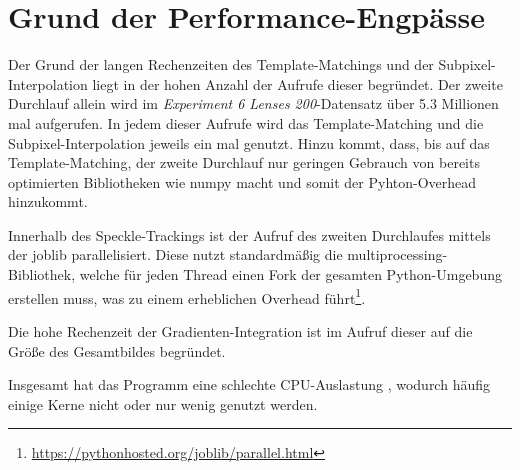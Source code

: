\section{Grund der Performance-Engpässe}

Der Grund der langen Rechenzeiten des Template-Matchings und der Subpixel-Interpolation liegt in der hohen Anzahl der Aufrufe dieser begründet. Der zweite Durchlauf allein wird im \textit{Experiment 6 Lenses 200}-Datensatz über 5.3 Millionen mal aufgerufen. In jedem dieser Aufrufe wird das Template-Matching und die Subpixel-Interpolation jeweils ein mal genutzt. Hinzu kommt, dass, bis auf das Template-Matching, der zweite Durchlauf nur geringen Gebrauch von bereits optimierten Bibliotheken wie numpy macht und somit der Pyhton-Overhead hinzukommt. 

Innerhalb des Speckle-Trackings ist der Aufruf des zweiten Durchlaufes mittels der joblib parallelisiert. Diese nutzt standardmäßig die multiprocessing-Bibliothek, welche für jeden Thread einen Fork der gesamten Python-Umgebung erstellen muss, was zu einem erheblichen Overhead führt\footnote{\url{https://pythonhosted.org/joblib/parallel.html}}.

Die hohe Rechenzeit der Gradienten-Integration ist im Aufruf dieser auf die Größe des Gesamtbildes begründet.

Insgesamt hat das Programm eine schlechte CPU-Auslastung , wodurch häufig einige Kerne nicht oder nur wenig genutzt werden. 